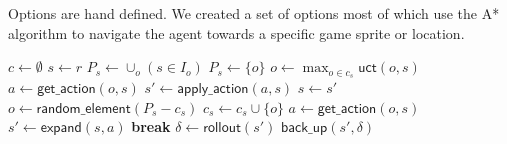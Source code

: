 Options are hand defined. We created a set of options most of which use the A*
algorithm to navigate the agent towards a specific game sprite or location.

\begin{algorithm}
	\caption{$\mathsf{O-MCTS}(r, m, d)$}
	\label{alg:omcts}
	\begin{algorithmic}[1]
		\State $c \gets \emptyset$ 
		 \label{alg:omcts:mainloop}
			\State $s \gets r$ 
			 \label{alg:omcts:innerloop}
			 \label{alg:omcts:sp} 
				\State $P_s \gets \cup_o (s \in I_o)$ 
				\Else
					\State $P_s \gets \{o\}$ 
				\EndIf \label{alg:omcts:ep}
					\State $o \gets \max_{o \in c_s} \mathsf{uct}(o, s)$ \label{alg:omcts:uct} 
					\State $a \gets \mathsf{get\_action}(o, s)$ 
					\State $s' \gets \mathsf{apply\_action}(a, s)$ \label{alg:omcts:apply}
					\State $s \gets s'$ \label{alg:omcts:ss} 
				\Else \label{alg:omcts:sexpand}
					\State $o \gets \mathsf{random\_element}(P_s - c_s)$ 
					\State $c_s \gets c_s \cup \{o\}$ 
					\State $a \gets \mathsf{get\_action}(o, s)$ 
					\State $s' \gets \mathsf{expand}(s, a)$ 
					\State \textbf{break} \label{alg:omcts:break}
				\EndIf \label{alg:omcts:eexpand}
			\EndWhile
			\State $\delta \gets \mathsf{rollout}(s')$ \label{alg:omcts:rollout}
			\State $\mathsf{back\_up}(s', \delta)$ \label{alg:omcts:backup}
		\EndWhile
		\State {}
	\end{algorithmic}
\end{algorithm}


